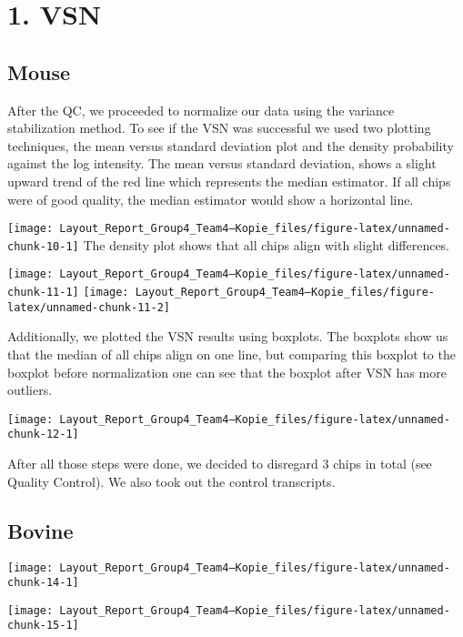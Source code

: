 \documentclass[
  parskip,
  oneside]{scrreprt}
\begin{document}
\hypertarget{vsn}{%
\section{1. VSN}\label{vsn}}

\hypertarget{mouse}{%
\subsection{Mouse}\label{mouse}}

After the QC, we proceeded to normalize our data using the variance
stabilization method. To see if the VSN was successful we used two
plotting techniques, the mean versus standard deviation plot and the
density probability against the log intensity. The mean versus standard
deviation, shows a slight upward trend of the red line which represents
the median estimator. If all chips were of good quality, the median
estimator would show a horizontal line.

\texttt{[image: Layout\_Report\_Group4\_Team4---Kopie\_files/figure-latex/unnamed-chunk-10-1]}
The density plot shows that all chips align with slight differences.

\texttt{[image: Layout\_Report\_Group4\_Team4---Kopie\_files/figure-latex/unnamed-chunk-11-1]}
\texttt{[image: Layout\_Report\_Group4\_Team4---Kopie\_files/figure-latex/unnamed-chunk-11-2]}

Additionally, we plotted the VSN results using boxplots. The boxplots
show us that the median of all chips align on one line, but comparing
this boxplot to the boxplot before normalization one can see that the
boxplot after VSN has more outliers.

\texttt{[image: Layout\_Report\_Group4\_Team4---Kopie\_files/figure-latex/unnamed-chunk-12-1]}

After all those steps were done, we decided to disregard 3 chips in
total (see Quality Control). We also took out the control transcripts.

\hypertarget{bovine-1}{%
\subsection{Bovine}\label{bovine-1}}

\texttt{[image: Layout\_Report\_Group4\_Team4---Kopie\_files/figure-latex/unnamed-chunk-14-1]}

\texttt{[image: Layout\_Report\_Group4\_Team4---Kopie\_files/figure-latex/unnamed-chunk-15-1]}
\end{document}
